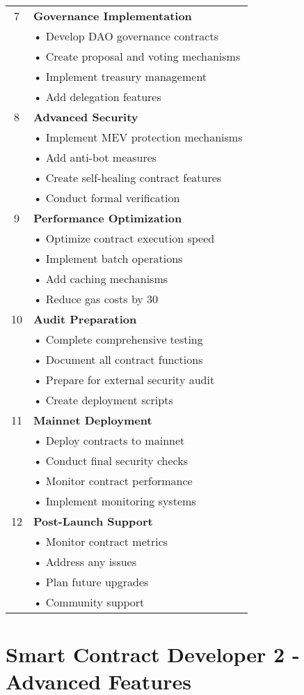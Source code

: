 \documentclass{article}
\begin{document}
\begin{longtable}{|c|p{}|}
\hline
7 & \textbf{Governance Implementation}\\
& • Develop DAO governance contracts\\
& • Create proposal and voting mechanisms\\
& • Implement treasury management\\
& • Add delegation features\\
\hline
8 & \textbf{Advanced Security}\\
& • Implement MEV protection mechanisms\\
& • Add anti-bot measures\\
& • Create self-healing contract features\\
& • Conduct formal verification\\
\hline
9 & \textbf{Performance Optimization}\\
& • Optimize contract execution speed\\
& • Implement batch operations\\
& • Add caching mechanisms\\
& • Reduce gas costs by 30\\%
\hline
10 & \textbf{Audit Preparation}\\
& • Complete comprehensive testing\\
& • Document all contract functions\\
& • Prepare for external security audit\\
& • Create deployment scripts\\
\hline
11 & \textbf{Mainnet Deployment}\\
& • Deploy contracts to mainnet\\
& • Conduct final security checks\\
& • Monitor contract performance\\
& • Implement monitoring systems\\
\hline
12 & \textbf{Post-Launch Support}\\
& • Monitor contract metrics\\
& • Address any issues\\
& • Plan future upgrades\\
& • Community support\\
\hline
\end{longtable}

\section*{Smart Contract Developer 2 - Advanced Features}
\end{document}
